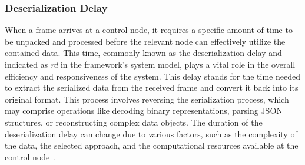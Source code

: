     \subsubsection{Deserialization Delay}

    When a frame arrives at a control node, it requires a specific amount of time to be unpacked and processed before the relevant node can effectively utilize the contained data. This time, commonly known as the deserialization delay and indicated as \textit{rd} in the framework's system model, plays a vital role in the overall efficiency and responsiveness of the system.
    This delay stands for the time needed to extract the serialized data from the received frame and convert it back into its original format. This process involves reversing the serialization process, which may comprise operations like decoding binary representations, parsing JSON structures, or reconstructing complex data objects. The duration of the deserialization delay can change due to various factors, such as the complexity of the data, the selected approach, and the computational resources available at the control node~\cite{askaripoor2023designer}.





